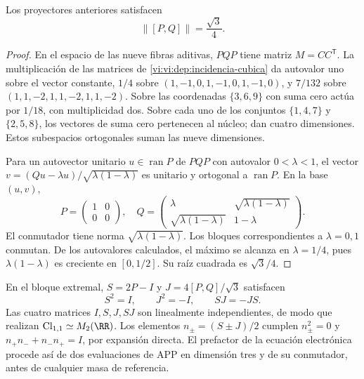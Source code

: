 \begin{proposition}
\label{vi:vi:dep:norma-PQ}
Los proyectores anteriores satisfacen
\begin{equation}
 \|[P,Q]\|=\frac{\sqrt3}{4}.
 \label{vi:vi:dep:prefactor-valor}
\end{equation}
\end{proposition}
\begin{proof}
En el espacio de las nueve fibras aditivas, \(PQP\) tiene matriz
\(M=CC^{\mathsf T}\). La multiplicación de las matrices de
\eqref{vi:vi:dep:incidencia-cubica} da autovalor uno sobre el vector
constante, \(1/4\) sobre \((1,-1,0,1,-1,0,1,-1,0)\), y
\(7/132\) sobre \((1,1,-2,1,1,-2,1,1,-2)\).
Sobre las coordenadas \(\{3,6,9\}\) con suma cero actúa por
\(1/18\), con multiplicidad dos. Sobre cada uno de los conjuntos
\(\{1,4,7\}\) y \(\{2,5,8\}\), los vectores de suma cero
pertenecen al núcleo; dan cuatro dimensiones. Estos subespacios
ortogonales suman las nueve dimensiones.

Para un autovector unitario \(u\in\operatorname{ran}P\) de
\(PQP\) con autovalor \(0<\lambda<1\), el vector
\(v=(Qu-\lambda u)/\sqrt{\lambda(1-\lambda)}\) es unitario y
ortogonal a \(\operatorname{ran}P\). En la base \((u,v)\),
\[
 P=\begin{pmatrix}1&0\\0&0\end{pmatrix},\quad
 Q=\begin{pmatrix}\lambda&\sqrt{\lambda(1-\lambda)}\\
 \sqrt{\lambda(1-\lambda)}&1-\lambda\end{pmatrix}.
\]
El conmutador tiene norma \(\sqrt{\lambda(1-\lambda)}\).
Los bloques correspondientes a \(\lambda=0,1\) conmutan. De los
autovalores calculados, el máximo se alcanza en \(\lambda=1/4\),
pues \(\lambda(1-\lambda)\) es creciente en \([0,1/2]\).
Su raíz cuadrada es \(\sqrt3/4\).
\end{proof}

En el bloque extremal, \(S=2P-I\) y
\(J=4[P,Q]/\sqrt3\) satisfacen
\[
 S^2=I,\qquad J^2=-I,\qquad SJ=-JS.
\]
Las cuatro matrices \(I,S,J,SJ\) son linealmente independientes,
de modo que realizan \(\mathrm{Cl}_{1,1}\simeq M_2(\RR)\).
Los elementos \(n_\pm=(S\pm J)/2\) cumplen
\(n_\pm^2=0\) y \(n_+n_-+n_-n_+=I\), por expansión directa.
El prefactor de la ecuación electrónica procede así de dos evaluaciones
de APP en dimensión tres y de su conmutador, antes de cualquier masa
de referencia.

